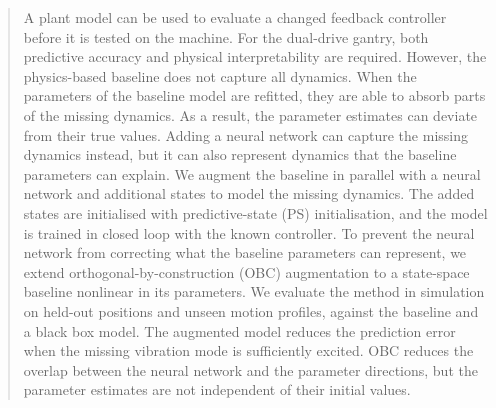 \begin{abstract}
A plant model can be used to evaluate a changed feedback controller before it is tested 
on the machine. For the dual-drive gantry, 
both predictive accuracy and physical interpretability are required. 
However, the physics-based baseline does not capture all dynamics. 
When the parameters of the baseline model are refitted, they are able to absorb parts of the missing dynamics.
As a result, the parameter estimates can deviate from their true values.
Adding a neural network can capture the missing dynamics instead, 
but it can also represent dynamics that the baseline parameters can explain.
We augment the baseline in parallel with a neural network and additional states 
to model the missing dynamics. The added states are initialised with predictive-state (PS) 
initialisation, and the model is trained in closed loop with the known controller. 
To prevent the neural network from correcting what the baseline parameters can represent, 
we extend orthogonal-by-construction (OBC) augmentation to a state-space baseline 
nonlinear in its parameters. We evaluate the method in simulation on held-out positions 
and unseen motion profiles, against the baseline and a black box model. 
The augmented model reduces the prediction error when the missing vibration mode is 
sufficiently excited. 
OBC reduces the overlap between the neural network and the parameter directions,
but the parameter estimates are not independent of their initial values.
\end{abstract}
